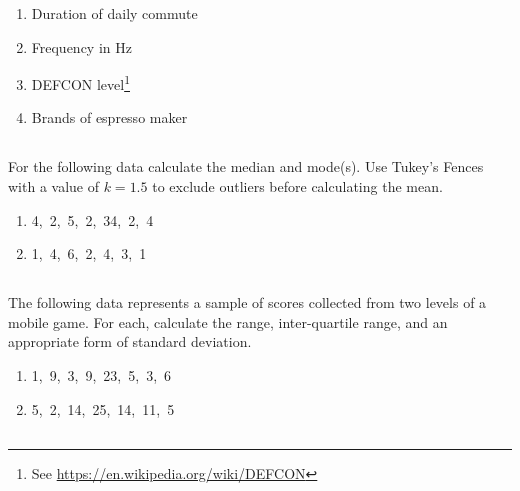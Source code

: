 \documentclass[twocolumn]{article}
\newcommand\mrk[1]{}
\begin{document}
    \begin{enumerate}
        \item Duration of daily commute \mrk{1}
        \item Frequency in Hz \mrk{1}
        \item DEFCON level\footnote{See \url{https://en.wikipedia.org/wiki/DEFCON}} \mrk{1}
        \item Brands of espresso maker \mrk{1}
    \end{enumerate}

\subsection{}

    For the following data calculate the median and mode(s). Use Tukey's Fences with a value of $k=1.5$ to exclude outliers before calculating the mean.

    \begin{multicols}{2}
        \begin{enumerate}
            \item \mbox{4, 2, 5, 2, 34, 2, 4 \mrk{1}}
            \item \mbox{1, 4, 6, 2, 4, 3, 1 \mrk{1}}
        \end{enumerate}
    \end{multicols}

\subsection{}

    The following data represents a sample of scores collected from two levels of a mobile game. For each, calculate the range, inter-quartile range, and an appropriate form of standard deviation.  

    \begin{multicols}{2}
        \begin{enumerate}
            \item \mbox{1, 9, 3, 9, 23, 5, 3, 6 \mrk{1}}
            \item \mbox{5, 2, 14, 25, 14, 11, 5 \mrk{1}}
        \end{enumerate}
    \end{multicols}

    \subsection{}
\end{document}
